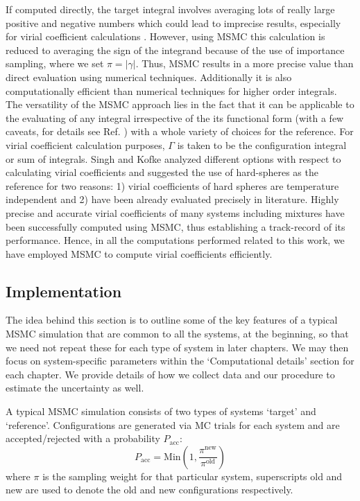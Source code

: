     If computed directly, the target integral involves averaging lots of really large positive and negative numbers which could lead to imprecise results, especially for virial coefficient calculations \cite{Singh2004}. However, using MSMC this calculation is reduced to averaging the sign of the integrand because of the use of importance sampling, where we set $\pi = |\gamma|$. Thus, MSMC results in a more precise value than direct evaluation using numerical techniques. Additionally it is also computationally efficient than numerical techniques for higher order integrals. The versatility of the MSMC approach lies in the fact that it can be applicable to the evaluating of any integral irrespective of the its functional form (with a few caveats, for details see Ref. \cite{Singh2004}) with a whole variety of choices for the reference. For virial coefficient calculation purposes, $\Gamma$ is taken to be the configuration integral or sum of integrals. Singh and Kofke \cite{Singh2004} analyzed different options with respect to calculating virial coefficients and suggested the use of hard-spheres as the reference for two reasons: 1) virial coefficients of hard spheres are temperature independent and 2) have been already evaluated precisely in literature. Highly precise and accurate virial coefficients of many systems including mixtures \cite{Benjamin2007,Benjamin2007JPCC,Benjamin2009,Schultz2009,Schultz2009m,Schultz2010,Shaul2010,Shaul2011JCP,Shaul2012SC,Shaul2012,Kim2013,Schultz2014,Schultz2015,Feng2015} have been successfully computed using MSMC, thus establishing a track-record of its performance. Hence, in all the computations performed related to this work, we have employed MSMC to compute virial coefficients efficiently.

    \subsection{Implementation}
    \label{subsec:MSMCimplementation}
        The idea behind this section is to outline some of the key features of a typical MSMC simulation that are common to all the systems, at the beginning, so that we need not repeat these for each type of system in later chapters. We may then focus on system-specific parameters within the `Computational details' section for each chapter. We provide details of how we collect data and our procedure to estimate the uncertainty as well.

        A typical MSMC simulation consists of two types of systems `target' and `reference'. Configurations are generated via MC trials for each system and are accepted/rejected with a probability $P_{\text{acc}}$:
        \begin{equation}
            \label{eq:MCacceptance}
            P_{\text{acc}} = \text{Min} \left(1, \displaystyle\frac{\pi^{\text{new}}}{\pi^{\text{old}}} \right)
        \end{equation}
        where $\pi$ is the sampling weight for that particular system, superscripts old and new are used to denote the old and new configurations respectively.

